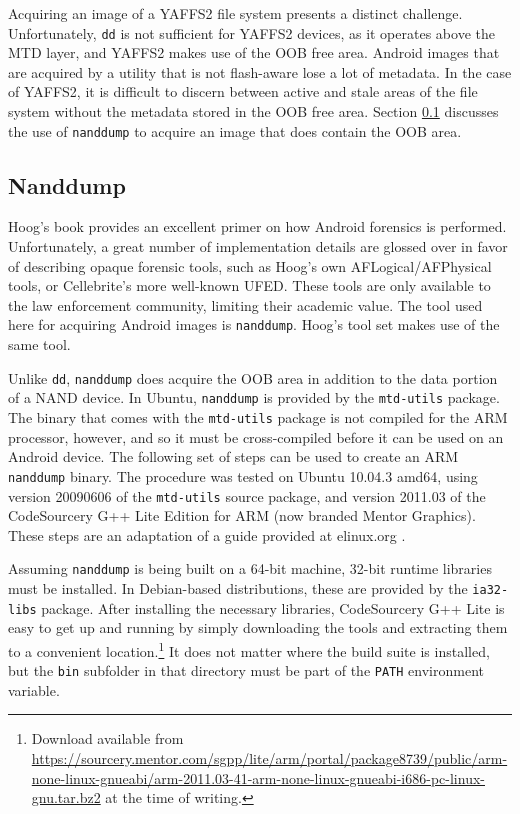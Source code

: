 Acquiring an image of a YAFFS2 file system presents a distinct challenge.  
Unfortunately, \texttt{dd} is not sufficient for YAFFS2 devices, as it operates above the MTD layer, and YAFFS2
makes use of the OOB free area. Android images that are acquired by a utility that is not flash-aware lose a lot of metadata. In the
case of YAFFS2, it is difficult to discern between active and stale areas of the file system without the metadata stored in
the OOB free area. Section \ref{sec:nanddump} discusses the use of \texttt{nanddump} to acquire an image that does contain the OOB
area.

\subsection{Nanddump}
\label{sec:nanddump}
Hoog's book \citeyear{hoog} provides an excellent primer on how Android forensics is performed.  Unfortunately, a great number of
implementation details are glossed over in favor of describing opaque forensic tools, such as Hoog's own AFLogical/AFPhysical tools,
or Cellebrite's more well-known UFED. These tools are only available to the law enforcement community, limiting their academic
value. The tool used here for acquiring Android images is \texttt{nanddump}. Hoog's tool set makes use of the same tool.

Unlike \texttt{dd}, \texttt{nanddump} does acquire the OOB area in addition to the data portion of a NAND device.  In Ubuntu,
\texttt{nanddump} is provided by the \texttt{mtd-utils} package.  The binary that comes with the \texttt{mtd-utils} package is not
compiled for the ARM processor, however, and so it must be cross-compiled before it can be used on an Android device.  The following
set of steps can be used to create an ARM \texttt{nanddump} binary.  The procedure was tested on Ubuntu 10.04.3 amd64, using version
20090606 of the \texttt{mtd-utils} source package, and version 2011.03 of the CodeSourcery G++ Lite Edition for ARM (now branded
Mentor Graphics).  These steps are an adaptation of a guide provided at elinux.org \cite{compilingmtd}.

Assuming \texttt{nanddump} is being built on a 64-bit machine, 32-bit runtime libraries must be installed.  In Debian-based
distributions, these are provided by the \texttt{ia32-libs} package.  After installing the necessary libraries, CodeSourcery G++ Lite
is easy to get up and running by simply downloading the tools and extracting them to a convenient location.\footnote{Download available
from
\url{https://sourcery.mentor.com/sgpp/lite/arm/portal/package8739/public/arm-none-linux-gnueabi/arm-2011.03-41-arm-none-linux-gnueabi-i686-pc-linux-gnu.tar.bz2}
at the time of writing.} It does not matter where the build suite is installed, but the \texttt{bin} subfolder in that directory
must be part of the \texttt{PATH} environment variable.

